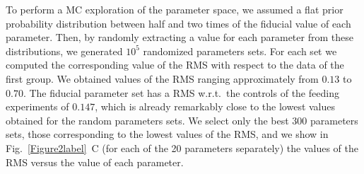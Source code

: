 \documentclass[oneside, 10pt, a4paper, twocolumn]{article}
\begin{document}
To perform a MC exploration of the parameter space, we assumed a flat prior probability distribution between half and two times of the fiducial value of each parameter. 
Then, by randomly extracting a value for each parameter from these distributions, we generated $10^5$ randomized parameters sets. 
For each set we computed the corresponding value of the RMS with respect to the data of the first group. We obtained values of the RMS ranging approximately from $0.13$ to $0.70$. 
The fiducial parameter set has a RMS w.r.t.~the controls of the feeding experiments of $0.147$, which is already remarkably close to the lowest values obtained for the random parameters sets. 
We select only the best {$300$} parameters sets, those corresponding to the lowest values of the RMS, 
and we show in Fig.~\ref{Figure2label}~C (for each of the 20 parameters separately) the values of the RMS versus the value of each parameter. 
\end{document}
